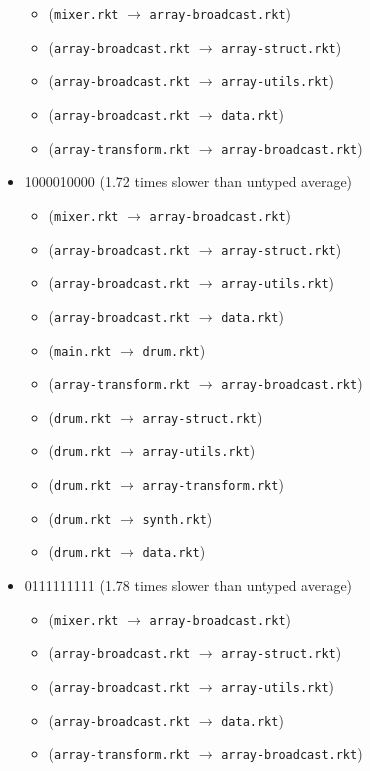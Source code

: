 \documentclass{article}
\newcommand{\mono}[1]{\texttt{#1}}
\begin{document}
\begin{itemize}
\begin{itemize}
  \item (\mono{mixer.rkt} $\rightarrow$ \mono{array-broadcast.rkt})
  \item (\mono{array-broadcast.rkt} $\rightarrow$ \mono{array-struct.rkt})
  \item (\mono{array-broadcast.rkt} $\rightarrow$ \mono{array-utils.rkt})
  \item (\mono{array-broadcast.rkt} $\rightarrow$ \mono{data.rkt})
  \item (\mono{array-transform.rkt} $\rightarrow$ \mono{array-broadcast.rkt})
  \end{itemize}
\item 1000010000 (1.72 times slower than untyped average)
  \begin{itemize}
  \item (\mono{mixer.rkt} $\rightarrow$ \mono{array-broadcast.rkt})
  \item (\mono{array-broadcast.rkt} $\rightarrow$ \mono{array-struct.rkt})
  \item (\mono{array-broadcast.rkt} $\rightarrow$ \mono{array-utils.rkt})
  \item (\mono{array-broadcast.rkt} $\rightarrow$ \mono{data.rkt})
  \item (\mono{main.rkt} $\rightarrow$ \mono{drum.rkt})
  \item (\mono{array-transform.rkt} $\rightarrow$ \mono{array-broadcast.rkt})
  \item (\mono{drum.rkt} $\rightarrow$ \mono{array-struct.rkt})
  \item (\mono{drum.rkt} $\rightarrow$ \mono{array-utils.rkt})
  \item (\mono{drum.rkt} $\rightarrow$ \mono{array-transform.rkt})
  \item (\mono{drum.rkt} $\rightarrow$ \mono{synth.rkt})
  \item (\mono{drum.rkt} $\rightarrow$ \mono{data.rkt})
  \end{itemize}
\item 0111111111 (1.78 times slower than untyped average)
  \begin{itemize}
  \item (\mono{mixer.rkt} $\rightarrow$ \mono{array-broadcast.rkt})
  \item (\mono{array-broadcast.rkt} $\rightarrow$ \mono{array-struct.rkt})
  \item (\mono{array-broadcast.rkt} $\rightarrow$ \mono{array-utils.rkt})
  \item (\mono{array-broadcast.rkt} $\rightarrow$ \mono{data.rkt})
  \item (\mono{array-transform.rkt} $\rightarrow$ \mono{array-broadcast.rkt})

\end{itemize}
\end{itemize}
\end{document}
